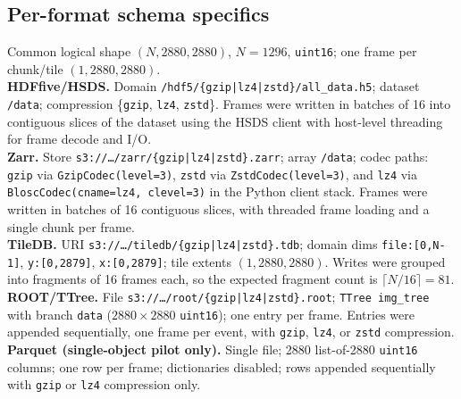 \documentclass[nomenclature, english, bibtex]{kththesis}
\numberwithin{listing}{chapter}
\begin{document}
\subsection{Per-format schema specifics}
\label{app:a6-schemas}
Common logical shape $(N,2880,2880)$, $N{=}1296$, \texttt{uint16}; one frame per chunk/tile $(1,2880,2880)$.\\
\textbf{\gls{HDFfive}/\gls{HSDS}.} Domain \texttt{/hdf5/\{gzip|lz4|zstd\}/all\_data.h5}; dataset \texttt{/data}; compression \{\texttt{gzip}, \texttt{lz4}, \texttt{zstd}\}. Frames were written in batches of 16 into contiguous slices of the dataset using the \gls{HSDS} client with host-level threading for frame decode and I/O.\\
\textbf{Zarr.} Store \texttt{s3://\dots/zarr/\{gzip|lz4|zstd\}.zarr}; array \texttt{/data}; codec paths: \texttt{gzip} via \texttt{GzipCodec(level=3)}, \texttt{zstd} via \texttt{ZstdCodec(level=3)}, and \texttt{lz4} via \texttt{BloscCodec(cname=lz4, clevel=3)} in the Python client stack. Frames were written in batches of 16 contiguous slices, with threaded frame loading and a single chunk per frame.\\
\textbf{TileDB.} URI \texttt{s3://\dots/tiledb/\{gzip|lz4|zstd\}.tdb}; domain dims \texttt{file:[0,N-1]}, \texttt{y:[0,2879]}, \texttt{x:[0,2879]}; tile extents $(1,2880,2880)$. Writes were grouped into fragments of 16 frames each, so the expected fragment count is $\lceil N/16\rceil=81$.\\
\textbf{\gls{ROOT}/\gls{TTree}.} File \texttt{s3://\dots/root/\{gzip|lz4|zstd\}.root}; \texttt{TTree img\_tree} with branch \texttt{data} ($2880\times2880$ \texttt{uint16}); one entry per frame. Entries were appended sequentially, one frame per event, with \texttt{gzip}, \texttt{lz4}, or \texttt{zstd} compression.\\
\textbf{Parquet (single-object pilot only).} Single file; 2880 list-of-2880 \texttt{uint16} columns; one row per frame; dictionaries disabled; rows appended sequentially with \texttt{gzip} or \texttt{lz4} compression only.
\end{document}
